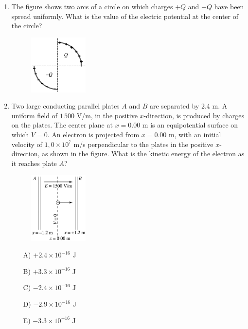 \begin{enumerate}

\item The figure shows two arcs of a circle on which charges $+Q$ and $-Q$ have been spread uniformly. What is the value of the electric potential at the center of the circle?

\begin{figure}[H]
        \centering
        \includegraphics[width=0.28\textwidth]{figures-workshop01/problem-38.png}
    \end{figure}


\item Two large conducting parallel plates $A$ and $B$ are separated by 2.4 m. A uniform field of $1\,500$ V/m, in the positive $x$-direction, is produced by charges on the plates. The center plane at $x=0.00$ m is an equipotential surface on which $V=0$. An electron is projected from $x=0.00$ m, with an initial velocity of $1,0\times10^7$ m/s perpendicular to the plates in the positive $x$-direction, as shown in the figure. What is the kinetic energy of the electron as it reaches plate $A$?

\begin{figure}[H]
        \centering
        \includegraphics[width=0.28\textwidth]{figures-workshop01/problem-39.png}
    \end{figure}

\begin{multicols}{5}
    \begin{itemize}
        \item[A)] $+2.4\times10^{-16}$ J
        \item[B)] $+3.3\times10^{-16}$ J
        \item[C)] $-2.4\times10^{-16}$ J
        \item[D)] $-2.9\times10^{-16}$ J
        \item[E)] $-3.3\times10^{-16}$ J
    \end{itemize}
\end{multicols}


\end{enumerate}
